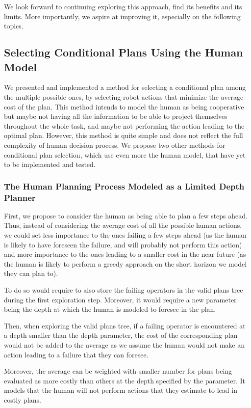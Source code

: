 \documentclass[a4paper,11pt,twoside]{StyleThese}
\begin{document}
We look forward to continuing exploring this approach, find its benefits and its limits. More importantly, we aspire at improving it, especially on the following topics.

\subsection{Selecting Conditional Plans Using the Human Model}
\label{subsec:chap4selectingplan}
We presented and implemented a method for selecting a conditional plan among the multiple possible ones, by selecting robot actions that minimize the average cost of the plan. This method intends to model the human as being cooperative but maybe not having all the information to be able to project themselves throughout the whole task, and maybe not performing the action leading to the optimal plan. However, this method is quite simple and does not reflect the full complexity of human decision process. We propose two other methods for conditional plan selection, which use even more the human model, that have yet to be implemented and tested.

\subsubsection{The Human Planning Process Modeled as a Limited Depth Planner}
First, we propose to consider the human as being able to plan a few steps ahead. Thus, instead of considering the average cost of all the possible human actions, we could set less importance to the ones failing a few steps ahead (as the human is likely to have foreseen the failure, and will probably not perform this action) and more importance to the ones leading to a smaller cost in the near future (as the human is likely to perform a greedy approach on the short horizon we model they can plan to).

To do so would require to also store the failing operators in the valid plans tree during the first exploration step. Moreover, it would require a new parameter being the depth at which the human is modeled to foresee in the plan. 

Then, when exploring the valid plans tree, if a failing operator is encountered at a depth smaller than the depth parameter, the cost of the corresponding plan would not be added to the average as we assume the human would not make an action leading to a failure that they can foresee. 

Moreover, the average can be weighted with smaller number for plans being evaluated as more costly than others at the depth specified by the parameter. It models that the human will not perform actions that they estimate to lead in costly plans.
\end{document}
